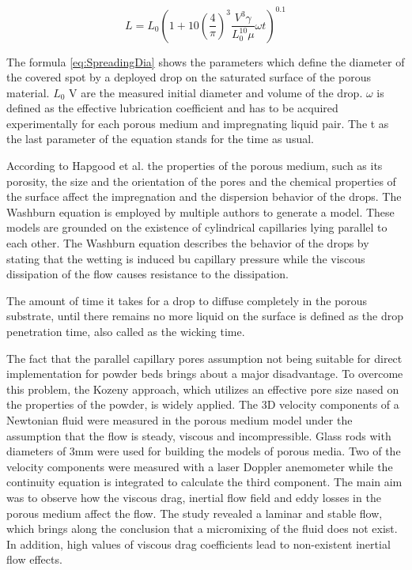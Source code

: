 \begin{equation} \label{eq:SpreadingDia}
L=L_0 (1+10(\frac{4}{\pi})^3 \frac{V^3 \gamma}{L_0^{10} \mu}\omega t)^{0.1}
\end{equation}
\newline

The formula \ref{eq:SpreadingDia} shows the parameters which define the diameter of the covered spot by a deployed drop on the saturated surface of the porous material. $L_0$ V are the measured initial diameter and volume of the drop. $\omega$ is defined as the effective lubrication coefficient and has to be acquired experimentally for each porous medium and impregnating liquid pair. The t as the last parameter of the equation stands for the time as usual. 

According to Hapgood et al. the properties of the porous medium, such as its porosity, the size and the orientation of the pores and the chemical properties of the surface affect the impregnation and the dispersion behavior of the drops. The Washburn equation is employed by multiple authors to generate a model. These models are grounded on the existence of cylindrical capillaries lying parallel to each other. The Washburn equation describes the behavior of the drops by stating that the wetting is induced bu capillary pressure while the viscous dissipation of the flow causes resistance to the dissipation.

The amount of time it takes for a drop to diffuse completely in the porous substrate, until there remains no more liquid on the surface is defined as the drop penetration time, also called as the wicking time.

The fact that the parallel capillary pores assumption not being suitable for direct implementation for powder beds brings about a major disadvantage. To overcome this problem, the Kozeny approach, which utilizes an effective pore size nased on the properties of the powder, is widely applied. The 3D velocity components of a Newtonian fluid were measured in the porous medium model under the assumption that the flow is steady, viscous and incompressible. Glass rods with diameters of 3mm were used for building the models of porous media. Two of the velocity components were measured with a laser Doppler anemometer while the  continuity equation is integrated to calculate the third component. The main aim was to observe how the viscous drag, inertial flow field and eddy losses in the porous medium affect the flow. The study revealed a laminar and stable  flow, which brings along the conclusion  that a micromixing of the fluid does not exist. In addition, high values of viscous drag coefficients lead to non-existent inertial flow effects.

